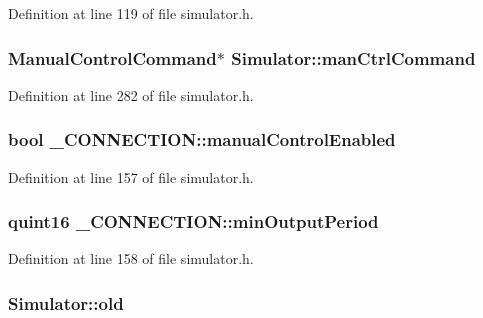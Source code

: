 Definition at line 119 of file simulator.\-h.

\hypertarget{group___h_i_t_l_plugin_ga1af06e35c7befb4f3ffd0bfee9a6efc2}{
\subsubsection[{man\-Ctrl\-Command}]{\setlength{\rightskip}{0pt plus 5cm}Manual\-Control\-Command$\ast$ Simulator\-::man\-Ctrl\-Command\hspace{0.3cm}{\ttfamily [protected]}}}\label{group___h_i_t_l_plugin_ga1af06e35c7befb4f3ffd0bfee9a6efc2}


Definition at line 282 of file simulator.\-h.

\hypertarget{group___h_i_t_l_plugin_gac67de1b6ac74a48c592f55fd17e06ad8}{
\subsubsection[{manual\-Control\-Enabled}]{\setlength{\rightskip}{0pt plus 5cm}bool \-\_\-\-C\-O\-N\-N\-E\-C\-T\-I\-O\-N\-::manual\-Control\-Enabled}}\label{group___h_i_t_l_plugin_gac67de1b6ac74a48c592f55fd17e06ad8}


Definition at line 157 of file simulator.\-h.

\hypertarget{group___h_i_t_l_plugin_ga11d8608f07438f05d1950aa62f774d0c}{
\subsubsection[{min\-Output\-Period}]{\setlength{\rightskip}{0pt plus 5cm}quint16 \-\_\-\-C\-O\-N\-N\-E\-C\-T\-I\-O\-N\-::min\-Output\-Period}}\label{group___h_i_t_l_plugin_ga11d8608f07438f05d1950aa62f774d0c}


Definition at line 158 of file simulator.\-h.

\hypertarget{group___h_i_t_l_plugin_gadb185afa7e72d63655cb097e1c1d8200}{
\subsubsection[{old}]{ Simulator\-::old\hspace{0.3cm}{\ttfamily [protected]}}}\label{group___h_i_t_l_plugin_gadb185afa7e72d63655cb097e1c1d8200}


